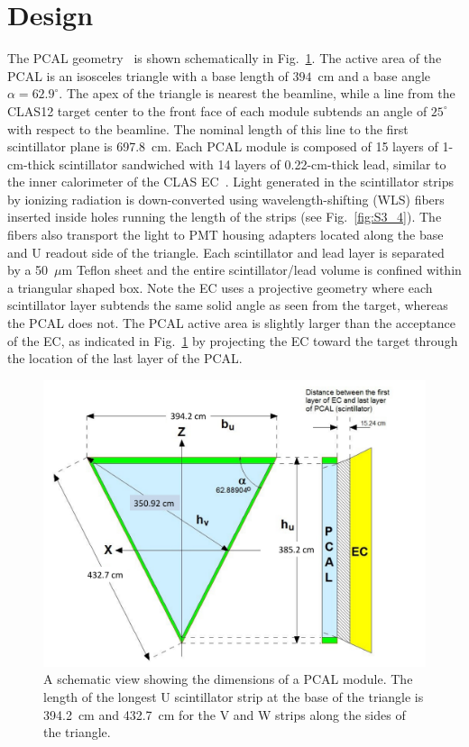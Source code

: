 \section{Design}
\label{Design}

The PCAL geometry~\cite{2015002} is shown schematically in Fig.~\ref{fig:S3_1}. The active area of the PCAL
is an isosceles triangle with a base length of $394$~cm and a base angle $\alpha=62.9^\circ$. The apex of the
triangle is nearest the beamline, while a line from the CLAS12 target center to the front face of each module
subtends an angle of $25^\circ$ with respect to the beamline. The nominal length of this line to the first
scintillator plane is 697.8~cm. Each PCAL module is composed of 15 layers of 1-cm-thick scintillator sandwiched
with 14 layers of 0.22-cm-thick lead, similar to the inner calorimeter of the CLAS EC~\cite{clas6nim}. Light
generated in the scintillator strips by ionizing radiation is down-converted using wavelength-shifting (WLS)
fibers inserted inside holes running the length of the strips (see Fig.~\ref{fig:S3_4}). The fibers also transport
the light to PMT housing adapters located along the base and U readout side of the triangle. Each scintillator and
lead layer is separated by a 50~$\mu$m Teflon sheet and the entire scintillator/lead volume is confined within a
triangular shaped box. Note the EC uses a projective geometry where each scintillator layer subtends the same
solid angle as seen from the target, whereas the PCAL does not. The PCAL active area is slightly larger than the
acceptance of the EC, as indicated in Fig.~\ref{fig:S3_1} by projecting the EC toward the target through the
location of the last layer of the PCAL.  

\begin{figure}[h]
\centering
\includegraphics[width=1.0\columnwidth,keepaspectratio]{img/S3_1.pdf}
\caption[Schematic plot of PCAL]{A schematic view showing the dimensions of a PCAL module. The length
of the longest U scintillator strip at the base of the triangle is 394.2~cm and 432.7~cm for the V
and W strips along the sides of the triangle. }
\label{fig:S3_1}
\end{figure}

